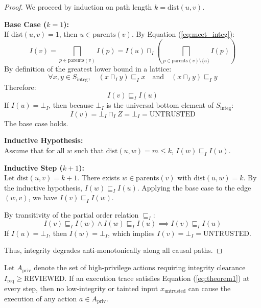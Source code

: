\begin{proof}
We proceed by induction on path length $k = \text{dist}(u, v)$.

\textbf{Base Case ($k = 1$):} \\
If $\text{dist}(u, v) = 1$, then $u \in \text{parents}(v)$. By Equation (\ref{eq:meet_integ}):
\begin{equation}
I(v) = \bigsqcap_{p \in \text{parents}(v)} I(p) = I(u) \sqcap_I \left(\bigsqcap_{p \in \text{parents}(v) \setminus \{u\}} I(p)\right)
\end{equation}
By definition of the greatest lower bound in a lattice:
\begin{equation}
\forall x, y \in S_{\text{integ}}, \quad (x \sqcap_I y) \sqsubseteq_I x \quad \text{and} \quad (x \sqcap_I y) \sqsubseteq_I y
\end{equation}
Therefore:
\begin{equation}
I(v) \sqsubseteq_I I(u)
\end{equation}
If $I(u) = \bot_I$, then because $\bot_I$ is the universal bottom element of $S_{\text{integ}}$:
\begin{equation}
I(v) = \bot_I \sqcap_I Z = \bot_I = \text{UNTRUSTED}
\end{equation}
The base case holds.

\textbf{Inductive Hypothesis:} \\
Assume that for all $w$ such that $\text{dist}(u, w) = m \le k$, $I(w) \sqsubseteq_I I(u)$.

\textbf{Inductive Step ($k + 1$):} \\
Let $\text{dist}(u, v) = k + 1$. There exists $w \in \text{parents}(v)$ with $\text{dist}(u, w) = k$. By the inductive hypothesis, $I(w) \sqsubseteq_I I(u)$. Applying the base case to the edge $(w, v)$, we have $I(v) \sqsubseteq_I I(w)$.

By transitivity of the partial order relation $\sqsubseteq_I$:
\begin{equation}
I(v) \sqsubseteq_I I(w) \land I(w) \sqsubseteq_I I(u) \implies I(v) \sqsubseteq_I I(u)
\end{equation}
If $I(u) = \bot_I$, then $I(w) = \bot_I$, which implies $I(v) = \bot_I = \text{UNTRUSTED}$. 

Thus, integrity degrades anti-monotonically along all causal paths.
\end{proof}

\begin{lemma}
\label{lem:non_interference}
Let $A_{\text{priv}}$ denote the set of high-privilege actions requiring integrity clearance $I_{\text{req}} \ge \text{REVIEWED}$. If an execution trace satisfies Equation (\ref{eq:theorem1}) at every step, then no low-integrity or tainted input $x_{\text{untrusted}}$ can cause the execution of any action $a \in A_{\text{priv}}$.
\end{lemma}

